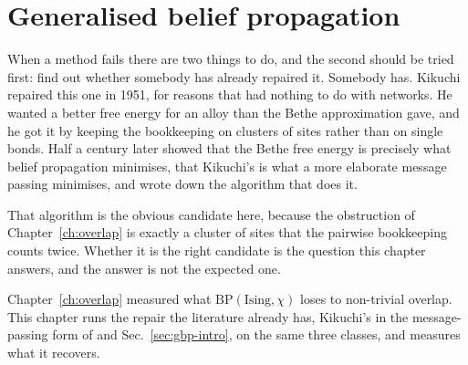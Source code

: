 \chapter{Generalised belief propagation}
\label{ch:gbp}

When a method fails there are two things to do, and the second should be tried
first: find out whether somebody has already repaired it. Somebody has. Kikuchi
repaired this one in 1951, for reasons that had nothing to do with networks. He
wanted a better free energy for an alloy than the Bethe approximation gave, and
he got it by keeping the bookkeeping on clusters of sites rather than on single
bonds. Half a century later \citet{yedidia2005} showed that the Bethe free
energy is precisely what belief propagation minimises, that Kikuchi's is what a
more elaborate message passing minimises, and wrote down the algorithm that does
it.

That algorithm is the obvious candidate here, because the obstruction of
Chapter~\ref{ch:overlap} is exactly a cluster of sites that the pairwise
bookkeeping counts twice. Whether it is the right candidate is the question this
chapter answers, and the answer is not the expected one.

Chapter~\ref{ch:overlap} measured what $\mathrm{BP}(\mathrm{Ising},\chi)$
loses to
non-trivial overlap. This chapter runs the repair the literature already has,
Kikuchi's in the message-passing form of \citet{yedidia2005} and
Sec.~\ref{sec:gbp-intro}, on the same three classes, and measures what it
recovers.

